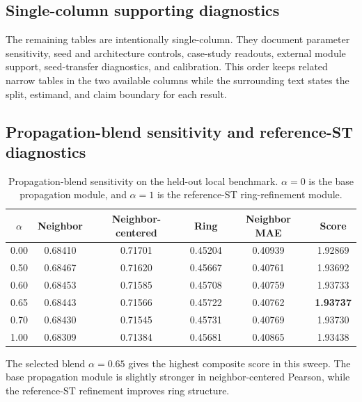 \documentclass[sigconf,review,balance=false]{acmart}
\begin{document}
\FloatBarrier
\subsection{Single-column supporting diagnostics}
\label{app:single_column_diagnostics}
The remaining tables are intentionally single-column. They document parameter
sensitivity, seed and architecture controls, case-study readouts, external
module support, seed-transfer diagnostics, and calibration. This order keeps
related narrow tables in the two available columns while the surrounding text
states the split, estimand, and claim boundary for each result.

\subsection{Propagation-blend sensitivity and reference-ST diagnostics}
\label{app:blend_and_reference_diagnostics}

\begin{table}[t]
\centering
\caption{Propagation-blend sensitivity on the held-out local benchmark. $\alpha=0$ is the base propagation module, and $\alpha=1$ is the reference-ST ring-refinement module.}
\label{tab:app_blend_sweep}
\small
\setlength{\tabcolsep}{5pt}
\renewcommand{\arraystretch}{1.10}
\begin{tabular}{cccccc}
\toprule
$\alpha$ & Neighbor & Neighbor-centered & Ring & Neighbor MAE & Score \\
\midrule
0.00 & 0.68410 & 0.71701 & 0.45204 & 0.40939 & 1.92869 \\
0.50 & 0.68467 & 0.71620 & 0.45667 & 0.40761 & 1.93692 \\
0.60 & 0.68453 & 0.71585 & 0.45708 & 0.40759 & 1.93733 \\
0.65 & 0.68443 & 0.71566 & 0.45722 & 0.40762 & \textbf{1.93737} \\
0.70 & 0.68430 & 0.71545 & 0.45731 & 0.40769 & 1.93730 \\
1.00 & 0.68309 & 0.71384 & 0.45681 & 0.40865 & 1.93438 \\
\bottomrule
\end{tabular}
\end{table}

The selected blend $\alpha=0.65$ gives the highest composite score in this sweep. The base propagation module is slightly stronger in neighbor-centered Pearson, while the reference-ST refinement improves ring structure.
\end{document}
